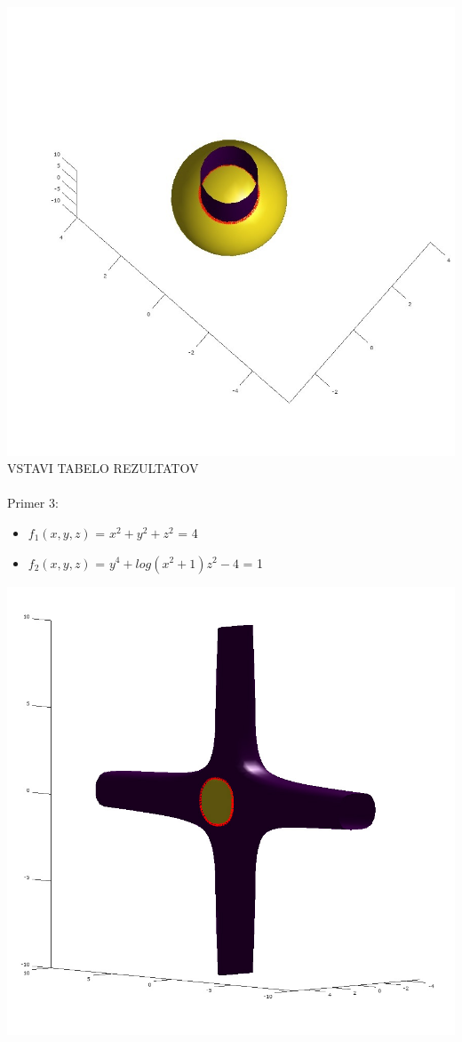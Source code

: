 \documentclass[]{article}
\begin{document}
	\includegraphics[scale=0.3]{primer2_2}
	VSTAVI TABELO REZULTATOV\\ \\
	Primer 3:
	\begin{itemize}  
		\item $f_{1}(x,y,z)$ = $x^2 + y^2 + z^2$ = 4
		\item $f_{2}(x,y,z)$ = $y^4 + log(x^2 + 1)z^2 - 4$ = 1
	\end{itemize}
	\includegraphics[scale=0.3]{primer3_1}
\end{document}
